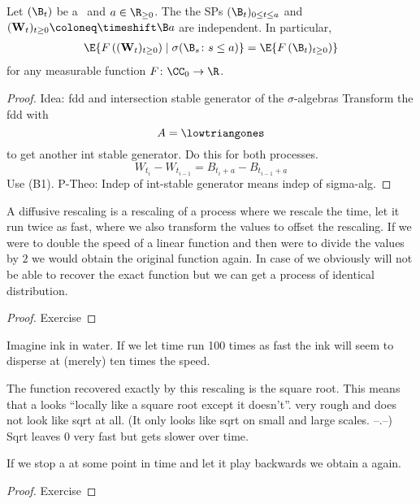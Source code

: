 \begin{prop}
	Let $(\B_t)$ be a \BMd\ and $a \in \R_{\geq 0}$.
	The the SPs $(\B_t)_{0 \leq t \leq a}$ and
	$(\mathbf{W}_t)_{t \geq 0} \coloneq\timeshift\B a$ are
	independent.
	In particular,
	\begin{align*}
		\E{F\left((\mathbf{W}_t)_{t\geq 0}\right)\mid \sigma(\B_s
		\colon s\leq a)}=\E{F\left(\B_t)_{t \geq 0}\right)}
	\end{align*}
	for any measurable function $F \colon \CC_0 \to \R$.
\end{prop}

\begin{proof}
	Idea: fdd and intersection stable generator of the \(\sigma\)-algebras
	Transform the fdd with \[A = \lowtriangones\]
	to get another int stable generator.
	Do this for both processes.
	\[W_{t_i}-W_{t_{i-1}} = B_{t_i+a}-B_{t_{i-1}+a}\]
	Use (B1).
	P-Theo: Indep of int-stable generator means indep of sigma-alg.
\end{proof}

A diffusive rescaling is a rescaling of a process
where we rescale the time,
\eg let it run twice as fast,
where we also transform the values to offset the rescaling.
If we were to double the speed of a linear function
and then were to divide the values by \(2\)
we would obtain the original function again.
In case of \BM we obviously will not be able to recover the exact function
but we can get a process of identical distribution.

\begin{prop}
\end{prop}

\begin{proof} Exercise\end{proof}

Imagine ink in water.
If we let time run 100 times as fast
the ink will seem to disperse at (merely) ten times the speed.

The function recovered exactly by this rescaling is the square root.
This means that a \BM looks “locally like a square root except it doesn't”.
\BM very rough and does not look like sqrt at all.
(It only looks like sqrt on small and large scales. –.–)
Sqrt leaves \(0\) very fast but gets slower over time.

If we stop a \BM at some point in time
and let it play backwards
we obtain a \BM again.

\begin{prop}
\end{prop}
\begin{proof} Exercise\end{proof}

